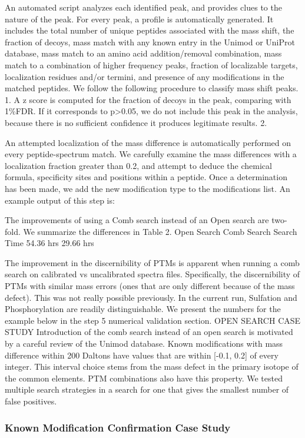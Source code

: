 \documentclass[journal=jprobs,manuscript=article]{achemso}
\begin{document}
An automated script analyzes each identified peak, and provides clues to the nature of the peak. For every peak, a profile is automatically generated.
It includes the total number of unique peptides associated with the mass shift, the fraction of decoys, mass match with any known entry in the Unimod or UniProt database, mass match to an amino acid addition/removal combination, mass match to a combination of higher frequency peaks, fraction of localizable targets, localization residues and/or termini, and presence of any modifications in the matched peptides.
We follow the following procedure to classify mass shift peaks. 
1.	A z score is computed for the fraction of decoys in the peak, comparing with 1\%FDR. If it corresponds to p>0.05, we do not include this peak in the analysis, because there is no sufficient confidence it produces legitimate results.
2.	

An attempted localization of the mass difference is automatically performed on every peptide-spectrum match. We carefully examine the mass differences with a localization fraction greater than 0.2, and attempt to deduce the chemical formula, specificity sites and positions within a peptide.
Once a determination has been made, we add the new modification type to the modifications list.
An example output of this step is:
 

The improvements of using a Comb search instead of an Open search are two-fold. We summarize the differences in Table 2.
	Open Search	Comb Search
Search Time	54.36 hrs	29.66 hrs
 
The improvement in the discernibility of PTMs is apparent when running a comb search on calibrated vs uncalibrated spectra files. Specifically, the discernibility of PTMs with similar mass errors (ones that are only different because of the mass defect).
This was not really possible previously.
In the current run, Sulfation and Phosphorylation are readily distinguishable.
We present the numbers for the example below in the step 5 numerical validation section.
OPEN SEARCH CASE STUDY
Introduction of the comb search instead of an open search is motivated by a careful review of the Unimod database.
Known modifications with mass difference within 200 Daltons have values that are within [-0.1, 0.2] of every integer.
This interval choice stems from the mass defect in the primary isotope of the common elements.
PTM combinations also have this property.
We tested multiple search strategies in a search for one that gives the smallest number of false positives. 
\subsubsection{Known Modification Confirmation Case Study}
\end{document}
